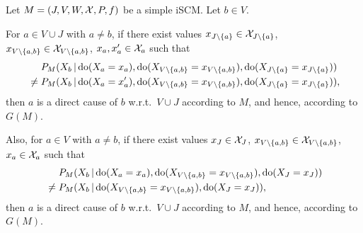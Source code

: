 \begin{Cor}\label{cor:scm_identify_direct_causal_relation}
  Let $M = \left ( J, V, W, \mathcal{X}, P, f \right )$ be a simple iSCM.
  Let $b \in V$.

  For $a \in V \cup J$ with $a \ne b$, if there exist values $x_{J\setminus\{a\}} \in \mathcal{X}_{J\setminus\{a\}}$, $x_{V\setminus\{a,b\}} \in \mathcal{X}_{V\setminus\{a,b\}}$, $x_a,x_a' \in \mathcal{X}_a$ such that
      \begin{equation*}\begin{split}
        & P_{M}(X_b \operatorname*{|} \operatorname{do}(X_a=x_a),\operatorname{do}(X_{V\setminus\{a,b\}}=x_{V\setminus\{a,b\}}),\operatorname{do}(X_{J\setminus \{a\}}=x_{J\setminus \{a\}})) \\
        {} \ne {} & P_{M}(X_b \operatorname*{|} \operatorname{do}(X_a=x_a'),\operatorname{do}(X_{V\setminus\{a,b\}}=x_{V\setminus\{a,b\}}),\operatorname{do}(X_{J\setminus\{a\}}=x_{J\setminus\{a\}})),
      \end{split}\end{equation*}
  then $a$ is a direct cause of $b$ w.r.t.\ $V \cup J$ according to $M$, and hence, according to $G(M)$.

  Also, for $a \in V$ with $a \ne b$, if there exist values $x_J \in \mathcal{X}_J$, $x_{V\setminus\{a,b\}} \in \mathcal{X}_{V\setminus\{a,b\}}$, $x_a \in \mathcal{X}_a$ such that
      \begin{equation*}\begin{split}
        & P_{M}(X_b \operatorname*{|} \operatorname{do}(X_a=x_a),\operatorname{do}(X_{V\setminus\{a,b\}}=x_{V\setminus\{a,b\}}),\operatorname{do}(X_J=x_J)) \\
        {} \ne {} & P_{M}(X_b \operatorname*{|} \operatorname{do}(X_{V\setminus\{a,b\}}=x_{V\setminus\{a,b\}}),\operatorname{do}(X_J=x_J)),
      \end{split}\end{equation*}
  then $a$ is a direct cause of $b$ w.r.t.\ $V \cup J$ according to $M$, and hence, according to $G(M)$.
\end{Cor}
